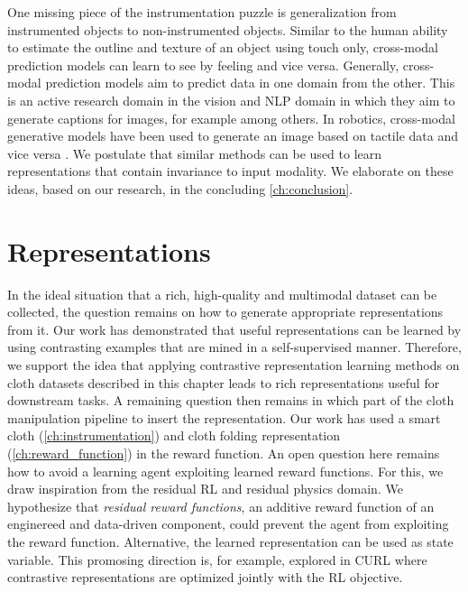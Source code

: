\documentclass[\home/main.tex]{subfiles}
\begin{document}
One missing piece of the instrumentation puzzle is generalization from instrumented objects to non-instrumented objects. Similar to the human ability to estimate the outline and texture of an object using touch only, cross-modal prediction models can learn to see by feeling and vice versa. Generally, cross-modal prediction models aim to predict data in one domain from the other. This is an active research domain in the vision and NLP domain in which they aim to generate captions for images, for example \autocite{donahue2015long} among others. In robotics, cross-modal generative models have been used to generate an image based on tactile data and vice versa \autocite{Li2019}. We postulate that similar methods can be used to learn representations that contain invariance to input modality. We elaborate on these ideas, based on our research, in the concluding \cref{ch:conclusion}. 

\section{Representations} \label{sec:towards_sensing_representation}

In the ideal situation that a rich, high-quality and multimodal dataset can be collected, the question remains on how to generate appropriate representations from it. Our work has demonstrated that useful representations can be learned by using contrasting examples that are mined in a self-supervised manner. Therefore, we support the idea that applying contrastive representation learning methods on cloth datasets described in this chapter leads to rich representations useful for downstream tasks. A remaining question then remains in which part of the cloth manipulation pipeline to insert the representation. Our work has used a smart cloth (\cref{ch:instrumentation}) and cloth folding representation (\cref{ch:reward_function}) in the reward function. An open question here remains how to avoid a learning agent exploiting learned reward functions. For this, we draw inspiration from the residual RL and residual physics domain. We hypothesize that \emph{residual reward functions}, an additive reward function of an enginereed and data-driven component, could prevent the agent from exploiting the reward function. Alternative, the learned representation can be used as state variable. This promosing direction is, for example, explored in CURL \autocite{Srinivas2020CURL} where contrastive representations are optimized jointly with the RL objective. 
\end{document}

